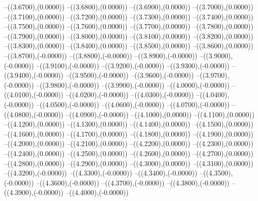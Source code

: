 {	--({\sx*(3.6700)},{\sy*(0.0000)})
	--({\sx*(3.6800)},{\sy*(0.0000)})
	--({\sx*(3.6900)},{\sy*(0.0000)})
	--({\sx*(3.7000)},{\sy*(0.0000)})
	--({\sx*(3.7100)},{\sy*(0.0000)})
	--({\sx*(3.7200)},{\sy*(0.0000)})
	--({\sx*(3.7300)},{\sy*(0.0000)})
	--({\sx*(3.7400)},{\sy*(0.0000)})
	--({\sx*(3.7500)},{\sy*(0.0000)})
	--({\sx*(3.7600)},{\sy*(0.0000)})
	--({\sx*(3.7700)},{\sy*(0.0000)})
	--({\sx*(3.7800)},{\sy*(0.0000)})
	--({\sx*(3.7900)},{\sy*(0.0000)})
	--({\sx*(3.8000)},{\sy*(0.0000)})
	--({\sx*(3.8100)},{\sy*(0.0000)})
	--({\sx*(3.8200)},{\sy*(0.0000)})
	--({\sx*(3.8300)},{\sy*(0.0000)})
	--({\sx*(3.8400)},{\sy*(0.0000)})
	--({\sx*(3.8500)},{\sy*(0.0000)})
	--({\sx*(3.8600)},{\sy*(0.0000)})
	--({\sx*(3.8700)},{\sy*(-0.0000)})
	--({\sx*(3.8800)},{\sy*(-0.0000)})
	--({\sx*(3.8900)},{\sy*(-0.0000)})
	--({\sx*(3.9000)},{\sy*(-0.0000)})
	--({\sx*(3.9100)},{\sy*(-0.0000)})
	--({\sx*(3.9200)},{\sy*(-0.0000)})
	--({\sx*(3.9300)},{\sy*(-0.0000)})
	--({\sx*(3.9400)},{\sy*(-0.0000)})
	--({\sx*(3.9500)},{\sy*(-0.0000)})
	--({\sx*(3.9600)},{\sy*(-0.0000)})
	--({\sx*(3.9700)},{\sy*(-0.0000)})
	--({\sx*(3.9800)},{\sy*(-0.0000)})
	--({\sx*(3.9900)},{\sy*(-0.0000)})
	--({\sx*(4.0000)},{\sy*(-0.0000)})
	--({\sx*(4.0100)},{\sy*(-0.0000)})
	--({\sx*(4.0200)},{\sy*(-0.0000)})
	--({\sx*(4.0300)},{\sy*(-0.0000)})
	--({\sx*(4.0400)},{\sy*(-0.0000)})
	--({\sx*(4.0500)},{\sy*(-0.0000)})
	--({\sx*(4.0600)},{\sy*(-0.0000)})
	--({\sx*(4.0700)},{\sy*(-0.0000)})
	--({\sx*(4.0800)},{\sy*(-0.0000)})
	--({\sx*(4.0900)},{\sy*(-0.0000)})
	--({\sx*(4.1000)},{\sy*(0.0000)})
	--({\sx*(4.1100)},{\sy*(0.0000)})
	--({\sx*(4.1200)},{\sy*(0.0000)})
	--({\sx*(4.1300)},{\sy*(0.0000)})
	--({\sx*(4.1400)},{\sy*(0.0000)})
	--({\sx*(4.1500)},{\sy*(0.0000)})
	--({\sx*(4.1600)},{\sy*(0.0000)})
	--({\sx*(4.1700)},{\sy*(0.0000)})
	--({\sx*(4.1800)},{\sy*(0.0000)})
	--({\sx*(4.1900)},{\sy*(0.0000)})
	--({\sx*(4.2000)},{\sy*(0.0000)})
	--({\sx*(4.2100)},{\sy*(0.0000)})
	--({\sx*(4.2200)},{\sy*(0.0000)})
	--({\sx*(4.2300)},{\sy*(0.0000)})
	--({\sx*(4.2400)},{\sy*(0.0000)})
	--({\sx*(4.2500)},{\sy*(0.0000)})
	--({\sx*(4.2600)},{\sy*(0.0000)})
	--({\sx*(4.2700)},{\sy*(0.0000)})
	--({\sx*(4.2800)},{\sy*(0.0000)})
	--({\sx*(4.2900)},{\sy*(0.0000)})
	--({\sx*(4.3000)},{\sy*(0.0000)})
	--({\sx*(4.3100)},{\sy*(0.0000)})
	--({\sx*(4.3200)},{\sy*(-0.0000)})
	--({\sx*(4.3300)},{\sy*(-0.0000)})
	--({\sx*(4.3400)},{\sy*(-0.0000)})
	--({\sx*(4.3500)},{\sy*(-0.0000)})
	--({\sx*(4.3600)},{\sy*(-0.0000)})
	--({\sx*(4.3700)},{\sy*(-0.0000)})
	--({\sx*(4.3800)},{\sy*(-0.0000)})
	--({\sx*(4.3900)},{\sy*(-0.0000)})
	--({\sx*(4.4000)},{\sy*(-0.0000)})
}
